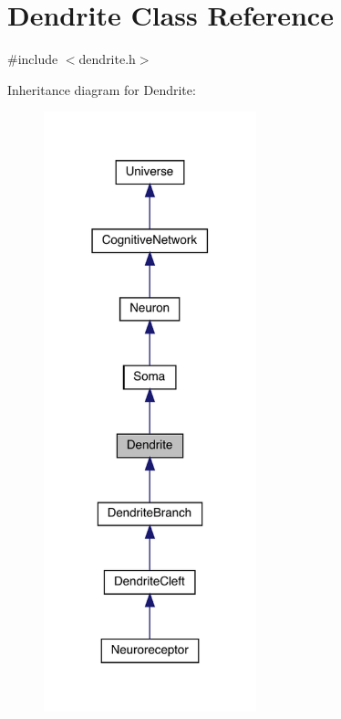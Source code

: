 \hypertarget{class_dendrite}{}\section{Dendrite Class Reference}
\label{class_dendrite}


{\ttfamily \#include $<$dendrite.\+h$>$}



Inheritance diagram for Dendrite\+:\nopagebreak
\begin{figure}[H]
\begin{center}
\leavevmode
\includegraphics[width=175pt]{class_dendrite__inherit__graph}
\end{center}
\end{figure}


